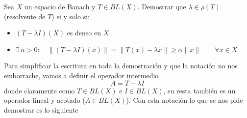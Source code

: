 \begin{ejercicio}
    Sea $X$ un espacio de Banach y $T \in BL(X)$. Demostrar que $\lambda \in \rho(T)$ (resolvente de $T$) si y solo si:
    \begin{itemize}
        \item[(i)] $(T - \lambda I)(X)$ es denso en $X$
        \item[(ii)] $\exists \, \alpha > 0 : \quad \|(T-\lambda I)(x)\|=\|T(x) - \lambda x\| \geq \alpha \|x\| \qquad \forall x \in X$
    \end{itemize}

    \noindent
    Para simplificar la escritura en toda la demostración y que la notación no nos emborrache, vamos a definir el operador intermedio
    $$A = T - \lambda I$$
    donde claramente como $T \in BL(X)$ e $I \in BL(X)$, su resta también es un operador lineal y acotado ($A \in BL(X)$). Con esta notación lo que se nos pide demostrar es lo siguiente


\end{ejercicio}
